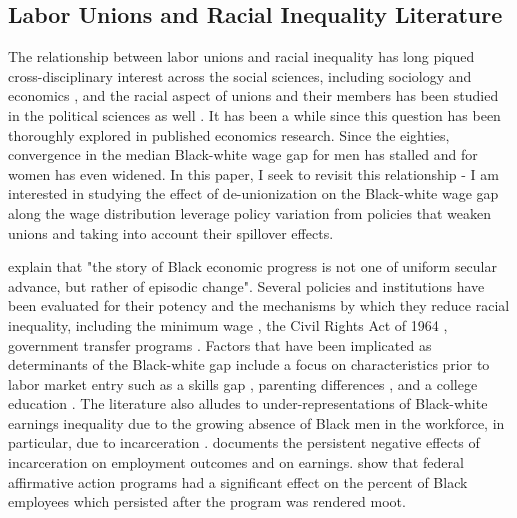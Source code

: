 \documentclass[11pt]{article}
\begin{document}
\subsection{Labor Unions and Racial Inequality Literature}
The relationship between labor unions and racial inequality has long piqued cross-disciplinary interest across the social sciences, including sociology \citep[see, for example,][]{rosenfeldkleykamp2012, mccall2001} and economics \citep[see, for example,][]{ashenfelter1972, boundfreeman1992}, and the racial aspect of unions and their members has been studied in the political sciences as well \citep[see, for example,][]{frymergrumbach2020}. It has been a while since this question has been thoroughly explored in published economics research. Since the eighties, convergence in the median Black-white wage gap for men has stalled and for women has even widened. In this paper, I seek to revisit this relationship - I am interested in studying the effect of de-unionization on the Black-white wage gap along the wage distribution leverage policy variation from policies that weaken unions and taking into account their spillover effects.

\citet{donohueheckman1991} explain that "the story of Black economic progress is not one of uniform secular advance, but rather of episodic change". Several policies and institutions have been evaluated for their potency and the mechanisms by which they reduce racial inequality, including the minimum wage \citep[see, for example,][]{derenoncourtmontialoux2020}, the Civil Rights Act of 1964 \citep[see, for example,][]{heckmanpayner1989, fgbh1973}, government transfer programs \citep[see, for example,][]{butlerheckman1977}. Factors that have been implicated as determinants of the Black-white gap include a focus on characteristics prior to labor market entry such as a skills gap \citep[see, for example,][]{nealjohnson1996}, parenting differences \citep[see, for example,][]{abhs2015}, and a college education \citep[see, for example,][]{abh2010}. The literature also alludes to under-representations of Black-white earnings inequality due to the growing absence of Black men in the workforce, in particular, due to incarceration \citep[see, for example][]{bayercharles2018, nealrick2014}. \citet{muellersmith2015} documents the persistent negative effects of incarceration on employment outcomes and on earnings. \citet{miller2017} show that federal affirmative action programs had a significant effect on the percent of Black employees which persisted after the program was rendered moot.
\end{document}
